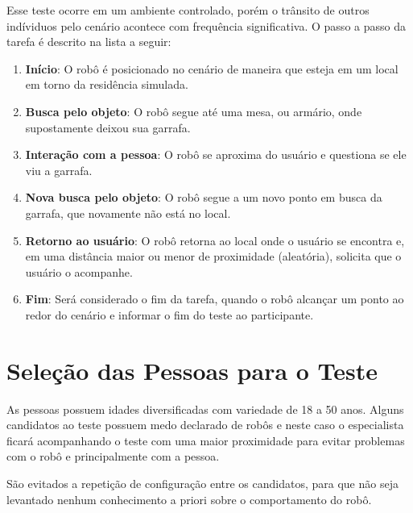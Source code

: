 Esse teste ocorre em um ambiente controlado, porém o trânsito de outros indíviduos pelo cenário acontece com frequência significativa. O passo a passo da tarefa é descrito na lista a seguir:

\begin{enumerate}
	\item \textbf{Início}: O robô é posicionado no cenário de maneira que esteja em um local em torno da residência simulada.
	\item \textbf{Busca pelo objeto}: O robô segue até uma mesa, ou armário, onde supostamente deixou sua garrafa.
	\item \textbf{Interação com a pessoa}: O robô se aproxima do usuário e questiona se ele viu a garrafa.
	\item \textbf{Nova busca pelo objeto}: O robô segue a um novo ponto em busca da garrafa, que novamente não está no local.
	\item \textbf{Retorno ao usuário}: O robô retorna ao local onde o usuário se encontra e, em uma distância maior ou menor de proximidade (aleatória), solicita que o usuário o acompanhe.
	\item \textbf{Fim}: Será considerado o fim da tarefa, quando o robô alcançar um ponto ao redor do cenário e informar o fim do teste ao participante.
\end{enumerate}

\section{Seleção das Pessoas para o Teste}
\label{sec:perfistestes}
As pessoas possuem idades diversificadas com variedade de 18 a 50 anos. Alguns candidatos ao teste possuem medo declarado de robôs e neste caso o especialista ficará acompanhando o teste com uma maior proximidade para evitar problemas com o robô e principalmente com a pessoa.

São evitados a repetição de configuração entre os candidatos, para que não seja levantado nenhum conhecimento a priori sobre o comportamento do robô.
